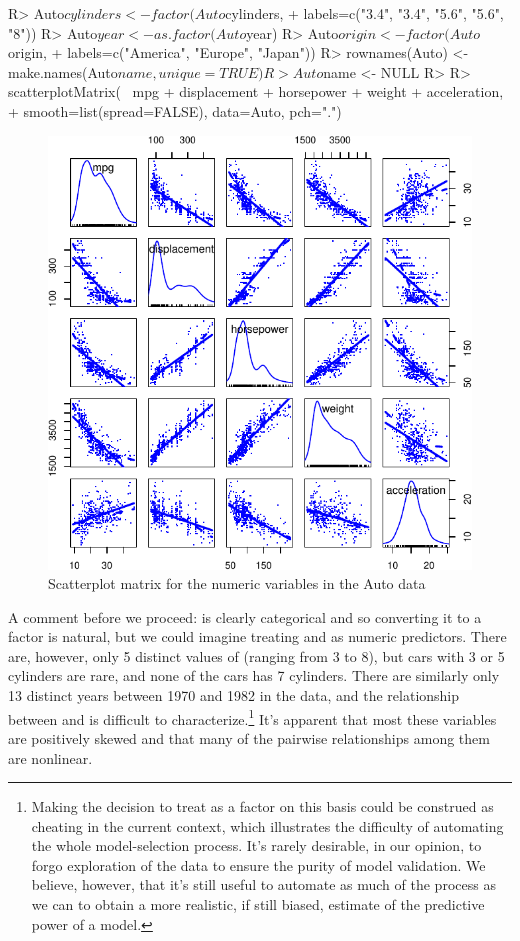 \documentclass[
]{jss}
\begin{document}
\begin{CodeChunk}
\begin{CodeInput}
R> Auto$cylinders <- factor(Auto$cylinders,
+                          labels=c("3.4", "3.4", "5.6", "5.6", "8"))
R> Auto$year <- as.factor(Auto$year)
R> Auto$origin <- factor(Auto$origin,
+                       labels=c("America", "Europe", "Japan"))
R> rownames(Auto) <- make.names(Auto$name, unique=TRUE)
R> Auto$name <- NULL
R> 
R> scatterplotMatrix(~ mpg + displacement + horsepower + weight + acceleration, 
+                   smooth=list(spread=FALSE), data=Auto, pch=".")
\end{CodeInput}
\begin{figure}

{\centering \includegraphics[width=0.6\linewidth]{JSS-article-reduced-2_files/figure-latex/Auto-explore-1} 

}

\caption[Scatterplot matrix for the numeric variables in the Auto data]{Scatterplot matrix for the numeric variables in the Auto data}\label{fig:Auto-explore}
\end{figure}
\end{CodeChunk}

A comment before we proceed:  is clearly categorical and so
converting it to a factor is natural, but we could imagine treating
 and  as numeric predictors. There are,
however, only 5 distinct values of  (ranging from 3 to
8), but cars with 3 or 5 cylinders are rare, and none of the cars has 7
cylinders. There are similarly only 13 distinct years between 1970 and
1982 in the data, and the relationship between  and
 is difficult to characterize.\footnote{Making the decision
  to treat  as a factor on this basis could be construed as
  cheating in the current context, which illustrates the difficulty of
  automating the whole model-selection process. It's rarely desirable,
  in our opinion, to forgo exploration of the data to ensure the purity
  of model validation. We believe, however, that it's still useful to
  automate as much of the process as we can to obtain a more realistic,
  if still biased, estimate of the predictive power of a model.} It's
apparent that most these variables are positively skewed and that many
of the pairwise relationships among them are nonlinear.
\end{document}
